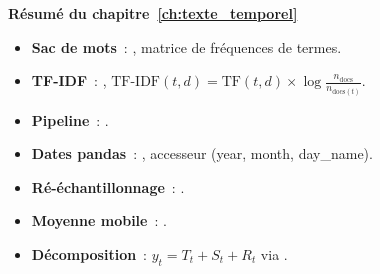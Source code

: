 \begin{formules}
\textbf{R\'esum\'e du chapitre~\ref{ch:texte_temporel}}
\begin{itemize}
    \item \textbf{Sac de mots}~: , matrice de fr\'equences de termes.
    \item \textbf{TF-IDF}~: , $\text{TF-IDF}(t,d) = \text{TF}(t,d) \times \log\frac{n_{\text{docs}}}{n_{\text{docs}(t)}}$.
    \item \textbf{Pipeline}~: .
    \item \textbf{Dates pandas}~: , accesseur  (year, month, day\_name).
    \item \textbf{R\'e-\'echantillonnage}~: .
    \item \textbf{Moyenne mobile}~: .
    \item \textbf{D\'ecomposition}~: $y_t = T_t + S_t + R_t$ via .
\end{itemize}
\end{formules}
